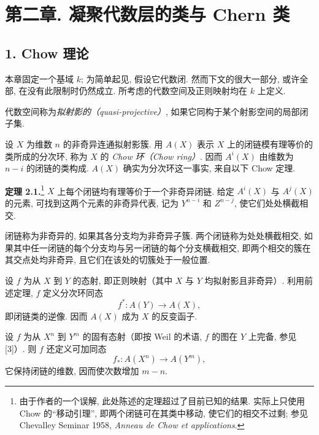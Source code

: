 \section*{第二章. 凝聚代数层的类与 Chern 类}

\subsection*{1. Chow 理论}

本章固定一个基域 $k$; 为简单起见, 假设它代数闭. 然而下文的很大一部分, 或许全部, 在没有此限制时仍然成立. 所考虑的代数空间及正则映射均在 $k$ 上定义.

代数空间称为\emph{拟射影的（quasi-projective）}, 如果它同构于某个射影空间的局部闭子集.

设 $X$ 为维数 $n$ 的非奇异连通拟射影簇. 用 $A(X)$ 表示 $X$ 上的闭链模有理等价的类所成的分次环, 称为 $X$ 的 \emph{Chow 环（Chow ring）}. 因而 $A^i(X)$ 由维数为 $n-i$ 的闭链的类构成. $A(X)$ 确实为分次环这一事实, 来自以下 Chow 定理.

\textbf{定理 2.1.}\footnote{由于作者的一个误解, 此处陈述的定理超过了目前已知的结果. 实际上只使用 Chow 的“移动引理”, 即两个闭链可在其类中移动, 使它们的相交不过剩; 参见 Chevalley Seminar 1958, \emph{Anneau de Chow et applications}.} $X$ 上每个闭链均有理等价于一个非奇异闭链. 给定 $A^i(X)$ 与 $A^j(X)$ 的元素, 可找到这两个元素的非奇异代表, 记为 $Y^{n-i}$ 和 $Z^{n-j}$, 使它们处处横截相交.

闭链称为非奇异的, 如果其各分支均为非奇异子簇. 两个闭链称为处处横截相交, 如果其中任一闭链的每个分支均与另一闭链的每个分支横截相交, 即两个相交的簇在其交点处均非奇异, 且它们在该处的切簇处于一般位置.

设 $f$ 为从 $X$ 到 $Y$ 的态射, 即正则映射（其中 $X$ 与 $Y$ 均拟射影且非奇异）. 利用前述定理, $f$ 定义分次环同态
\begin{equation}\tag{2.1}
f^*:A(Y)\longrightarrow A(X),
\end{equation}
即闭链类的逆像. 因而 $A(X)$ 成为 $X$ 的反变函子.

设 $f$ 为从 $X^n$ 到 $Y^m$ 的固有态射（即按 Weil 的术语, $f$ 的图在 $Y$ 上完备, 参见 [3]）. 则 $f$ 还定义可加同态
\begin{equation}\tag{2.2}
f_*:A(X^n)\longrightarrow A(Y^m),
\end{equation}
它保持闭链的维数, 因而使次数增加 $m-n$.




